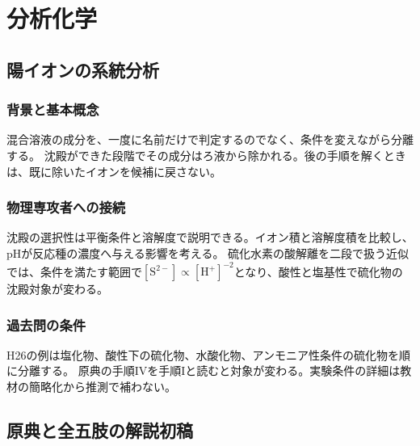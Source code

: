 \chapter{分析化学}
\section{陽イオンの系統分析}
\label{theory:analytical:separation}
\subsection{背景と基本概念}
混合溶液の成分を、一度に名前だけで判定するのでなく、条件を変えながら分離する。
沈殿ができた段階でその成分はろ液から除かれる。後の手順を解くときは、既に除いたイオンを候補に戻さない。
\subsection{物理専攻者への接続}
沈殿の選択性は平衡条件と溶解度で説明できる。イオン積と溶解度積を比較し、pHが反応種の濃度へ与える影響を考える。
硫化水素の酸解離を二段で扱う近似では、条件を満たす範囲で$[\mathrm{S}^{2-}]\propto[\mathrm{H}^+]^{-2}$となり、酸性と塩基性で硫化物の沈殿対象が変わる。
\subsection{過去問の条件}
H26の例は塩化物、酸性下の硫化物、水酸化物、アンモニア性条件の硫化物を順に分離する。
原典の手順IVを手順Iと読むと対象が変わる。実験条件の詳細は教材の簡略化から推測で補わない\cite{qualitative_stanford}。


\section{原典と全五肢の解説初稿}

